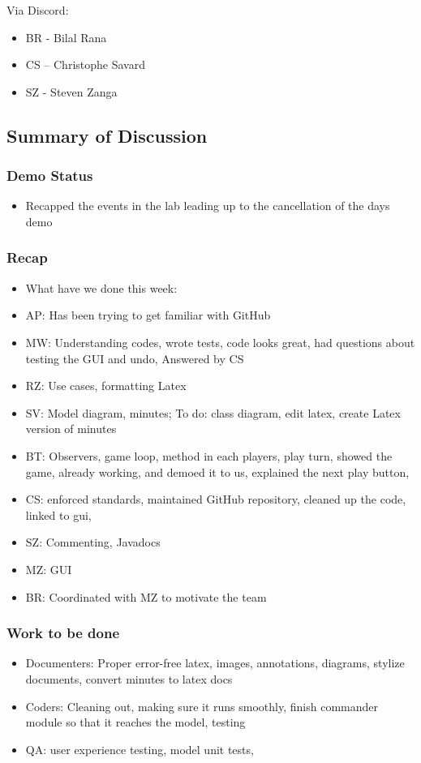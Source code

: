 \documentclass[12pt]{article}
\begin{document}
	Via Discord:
	\begin{itemize}
		\item BR - Bilal Rana
		\item CS – Christophe Savard 
		\item SZ - Steven Zanga
	\end{itemize}

	\subsection{Summary of Discussion }

	\subsubsection{Demo Status}
	\begin{itemize}
		\item Recapped the events in the lab leading up to the cancellation of the days demo
	\end{itemize}

	\subsubsection{Recap }
	\begin{itemize}
		\item What have we done this week: 
		\item AP: Has been trying to get familiar with GitHub 
		\item MW: Understanding codes, wrote tests, code looks great, had questions about testing the GUI and undo, Answered by CS 
		\item RZ: Use cases, formatting Latex 
		\item SV: Model diagram, minutes;  To do: class diagram, edit latex, create Latex version of minutes 
		\item BT: Observers, game loop, method in each players, play turn, showed the game, already working, and demoed it to us, explained the next play button, 
		\item CS: enforced standards, maintained GitHub repository, cleaned up the code, linked to gui, 
		\item SZ: Commenting, Javadocs
		\item MZ: GUI 
		\item BR: Coordinated with MZ to motivate the team  
	\end{itemize}
	
	\subsubsection{Work to be done }
	\begin{itemize}
		\item Documenters: Proper error-free latex, images, annotations, diagrams, stylize documents, convert minutes to latex docs
		\item Coders: Cleaning out, making sure it runs smoothly, finish commander module so that it reaches the model, testing  
		\item QA: user experience testing, model unit tests, 
	\end{itemize}
\end{document}
